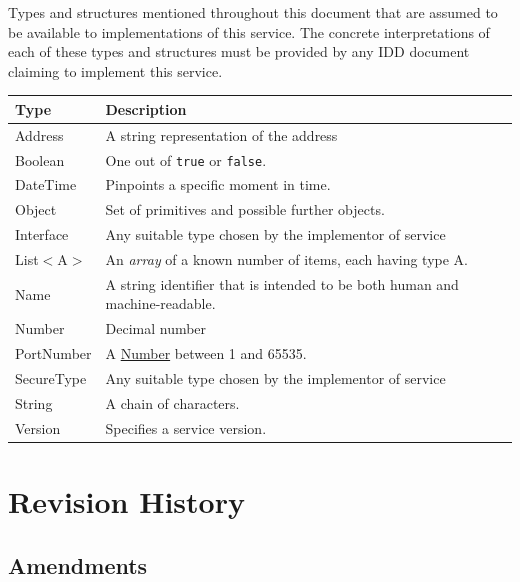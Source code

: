 \documentclass[a4paper]{arrowhead}
\newcommand{\pdef}[1]{{\textcolor{ArrowheadGrey}{#1\label{sec:model:primitives:#1}\label{sec:model:primitives:#1s}\label{sec:model:primitives:#1es}}}}
\newcommand{\pref}[1]{{\textcolor{ArrowheadGrey}{\hyperref[sec:model:primitives:#1]{#1}}}}
\begin{document}
Types and structures mentioned throughout this document that are assumed to be available to implementations of this service.
The concrete interpretations of each of these types and structures must be provided by any IDD document claiming to implement this service.


\begin{table}[ht!]
\begin{tabularx}{\textwidth}{| p{3cm} | X |} \hline
\rowcolor{gray!33} Type & Description \\ \hline
\pdef{Address}          & A string representation of the address \\ \hline
\pdef{Boolean}          & One out of \texttt{true} or \texttt{false}. \\ \hline
\pdef{DateTime}         & Pinpoints a specific moment in time. \\ \hline
\pdef{Object}           & Set of primitives and possible further objects. \\ \hline
\pdef{Interface}        & Any suitable type chosen by the implementor of service \\ \hline
\pdef{List}$<$A$>$      & An \textit{array} of a known number of items, each having type A. \\ \hline
\pdef{Name}             & A string identifier that is intended to be both human and machine-readable. \\ \hline
\pdef{Number}           & Decimal number \\ \hline
\pdef{PortNumber}       & A \pref{Number} between 1 and 65535. \\ \hline
\pdef{SecureType}       & Any suitable type chosen by the implementor of service \\ \hline
\pdef{String}           & A chain of characters. \\ \hline
\pdef{Version}          & Specifies a service version. \\ \hline
\end{tabularx}
\end{table}

\newpage




\newpage

\section{Revision History}
\subsection{Amendments}
\end{document}
